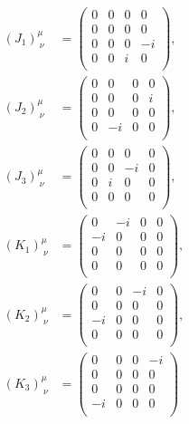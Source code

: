 \documentclass[10pt,a4paper]{jarticle}
\begin{document}
\begin{align}
(J_1)^\mu_{~\nu} &= \left(\begin{array}{cccc}
0 & 0 & 0 & 0 \\
0 & 0 & 0 & 0 \\
0 & 0 & 0 & -i \\
0 & 0 & i & 0 \\
\end{array}\right), \\
%
(J_2)^\mu_{~\nu} &= \left(\begin{array}{cccc}
0 & 0 & 0 & 0 \\
0 & 0 & 0 & i \\
0 & 0 & 0 & 0 \\
0 & -i & 0 & 0 \\
\end{array}\right), \\
%
(J_3)^\mu_{~\nu} &= \left(\begin{array}{cccc}
0 & 0 & 0 & 0 \\
0 & 0 & -i & 0 \\
0 & i & 0 & 0 \\
0 & 0 & 0 & 0 \\
\end{array}\right), \\
%
(K_1)^\mu_{~\nu} &= \left(\begin{array}{cccc}
0 & -i & 0 & 0 \\
-i & 0 & 0 & 0 \\
0 & 0 & 0 & 0 \\
0 & 0 & 0 & 0 \\
\end{array}\right), \\
%
(K_2)^\mu_{~\nu} &= \left(\begin{array}{cccc}
0 & 0 & -i & 0 \\
0 & 0 & 0 & 0 \\
-i & 0 & 0 & 0 \\
0 & 0 & 0 & 0 \\
\end{array}\right), \\
%
(K_3)^\mu_{~\nu} &= \left(\begin{array}{cccc}
0 & 0 & 0 & -i \\
0 & 0 & 0 & 0 \\
0 & 0 & 0 & 0 \\
-i & 0 & 0 & 0 \\
\end{array}\right)
\end{align}
\end{document}

